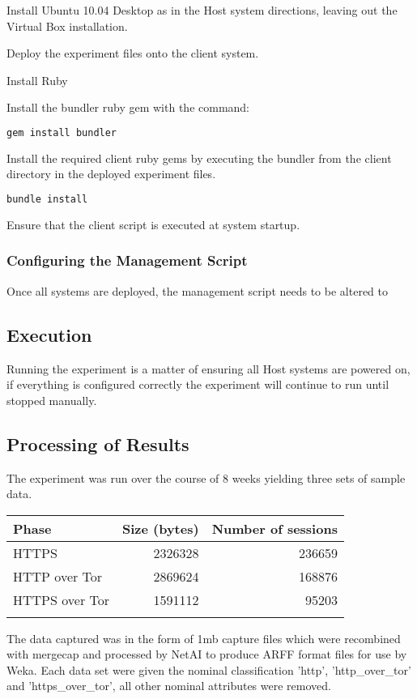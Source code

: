 Install Ubuntu 10.04 Desktop as in the Host system directions, leaving out the
Virtual Box installation.

\begin{enumerate*}
  \item Deploy the experiment files onto the client system.
  \item Install Ruby
  \item Install the bundler ruby gem with the command:
    \begin{lstlisting}[language=sh]
gem install bundler
    \end{lstlisting}
  \item Install the required client ruby gems by executing the bundler from the client directory in the deployed experiment files.
    \begin{lstlisting}[language=sh]
bundle install
    \end{lstlisting}
  \item Ensure that the client script is executed at system startup.
\end{enumerate*}

\subsubsection{Configuring the Management Script}

Once all systems are deployed, the management script needs to be altered to

\subsection{Execution}

Running the experiment is a matter of ensuring all Host systems are powered on,
if everything is configured correctly the experiment will continue to run until
stopped manually.

\subsection{Processing of Results}

The experiment was run over the course of 8 weeks yielding three sets of sample
data.

\begin{tabular}{lrr}
  \toprule
  Phase & Size (bytes) & Number of sessions\\
  \midrule
  HTTPS & 2326328 & 236659\\
  HTTP over Tor & 2869624 & 168876\\
  HTTPS over Tor & 1591112 & 95203\\
  \bottomrule
  \label{table:datasets}
\end{tabular}

The data captured was in the form of 1mb capture files which were recombined
with mergecap and processed by NetAI to produce ARFF format files for use by
Weka. Each data set were given the nominal classification 'http',
'http_over_tor' and 'https_over_tor', all other nominal attributes were removed.

